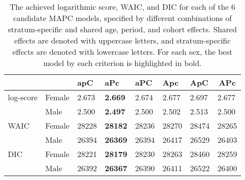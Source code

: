 \begin{table}[h!]
\centering
\begingroup\footnotesize{}

\begin{tabularx}{\textwidth}{llXXXXXX}
\hline
 &  & apC & aPc & aPC & Apc & ApC & \multicolumn{1}{c}{APc} \\ 
\hline
\nopagebreak log-score & \nopagebreak Female  & 2.673 & \textbf{ 2.669 } & 2.674 & 2.677 & 2.697 & 2.677 \\
 & \nopagebreak Male  & 2.500 & \textbf{ 2.497 } & 2.500 & 2.502 & 2.513 & 2.500 \\
\rule{0pt}{0.9\normalbaselineskip}WAIC & \nopagebreak Female  & 28228 & \textbf{ 28182 } & 28236 & 28270 & 28474 & 28265 \\
 & \nopagebreak Male  & 26394 & \textbf{ 26369 } & 26394 & 26417 & 26529 & 26403 \\
\rule{0pt}{0.9\normalbaselineskip}DIC & \nopagebreak Female  & 28221 & \textbf{ 28179 } & 28230 & 28263 & 28460 & 28259 \\
 & \nopagebreak Male  & 26392 & \textbf{ 26367 } & 26390 & 26411 & 26522 & 26400 \\
\hline 
\end{tabularx}\endgroup
 \caption{The achieved logarithmic score, WAIC, and DIC for each of the 6 candidate MAPC models, specified by different combinations of stratum-specific and shared age, period, and cohort effects. Shared effects are denoted with uppercase letters, and stratum-specific effects are denoted with lowercase letters. For each sex, the best model by each criterion is highlighted in bold.} \label{fig:model_selection_score}


\end{table}